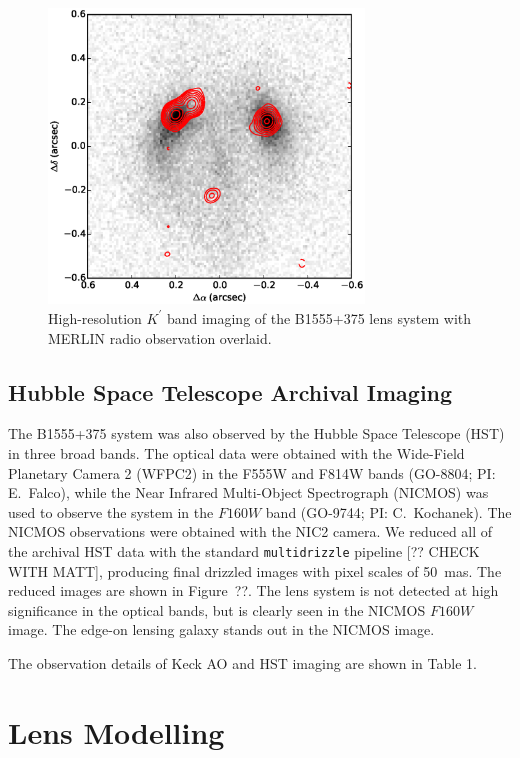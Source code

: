 \documentclass[usenatbib]{mn2e}
\begin{document}
\begin{figure}
\includegraphics[width=84mm]{1555_ao_merlin_overlay.eps}
\caption{High-resolution  $K^\prime$ band imaging of the B1555+375 lens system with MERLIN radio observation overlaid.
%
\label{fig:merlin}}
\end{figure}

\subsection{Hubble Space Telescope Archival Imaging}

The B1555+375 system was also observed by the Hubble Space Telescope
(HST) in three broad bands.  The optical data were obtained with the
Wide-Field Planetary Camera 2 (WFPC2) in the F555W and F814W bands
(GO-8804; PI: E.\ Falco), while the Near Infrared Multi-Object
Spectrograph (NICMOS) was used to observe the system in the $F160W$
band (GO-9744; PI: C.\ Kochanek).  The NICMOS observations were
obtained with the NIC2 camera.  We reduced all of the archival HST
data with the standard {\tt multidrizzle} pipeline [?? CHECK WITH
MATT], producing final drizzled images with pixel scales of
50~mas.  The reduced images are shown in Figure~??.  The lens system
is not detected at high significance in the optical bands, but is
clearly seen in the NICMOS $F160W$ image.  The edge-on lensing galaxy 
stands out in the NICMOS image.

The observation details of Keck AO and HST imaging are shown in Table 1.


\section{Lens Modelling}
\end{document}
